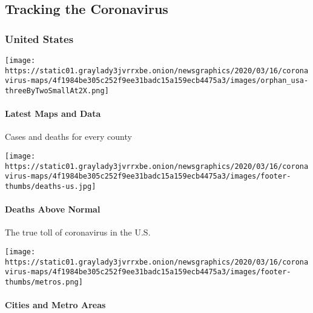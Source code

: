 \hypertarget{tracking-the-coronavirus}{%
\subsection{Tracking the Coronavirus}\label{tracking-the-coronavirus}}

\hypertarget{united-states}{%
\subsubsection{United States}\label{united-states}}

\href{https://www.nytimes3xbfgragh.onion/interactive/2020/us/coronavirus-us-cases.html}{}

\texttt{[image: https://static01.graylady3jvrrxbe.onion/newsgraphics/2020/03/16/coronavirus-maps/4f1984be305c252f9ee31badc15a159ecb4475a3/images/orphan\_usa-threeByTwoSmallAt2X.png]}

\hypertarget{latest-maps-and-data}{%
\paragraph{Latest Maps and Data}\label{latest-maps-and-data}}

Cases and deaths for every county

\href{https://www.nytimes3xbfgragh.onion/interactive/2020/05/05/us/coronavirus-death-toll-us.html}{}

\texttt{[image: https://static01.graylady3jvrrxbe.onion/newsgraphics/2020/03/16/coronavirus-maps/4f1984be305c252f9ee31badc15a159ecb4475a3/images/footer-thumbs/deaths-us.jpg]}

\hypertarget{deaths-above-normal}{%
\paragraph{Deaths Above Normal}\label{deaths-above-normal}}

The true toll of coronavirus in the U.S.

\href{https://www.nytimes3xbfgragh.onion/interactive/2020/04/23/upshot/five-ways-to-monitor-coronavirus-outbreak-us.html}{}

\texttt{[image: https://static01.graylady3jvrrxbe.onion/newsgraphics/2020/03/16/coronavirus-maps/4f1984be305c252f9ee31badc15a159ecb4475a3/images/footer-thumbs/metros.png]}

\hypertarget{cities-and-metro-areas}{%
\paragraph{Cities and Metro Areas}\label{cities-and-metro-areas}}


